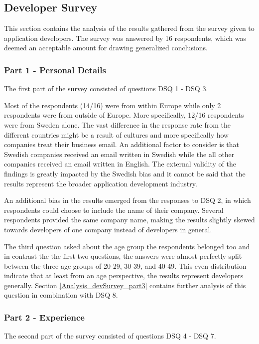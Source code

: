 \documentclass[a4paper,12pt]{article}
\begin{document}
\subsection{Developer Survey}
\label{Analysis_devSurvey}
This section contains the analysis of the results gathered from the survey given to application developers. The survey was answered by 16 respondents, which was deemed an acceptable amount for drawing generalized conclusions.

\subsubsection{Part 1 - Personal Details}
\label{Analysis_devSurvey_part1}
The first part of the survey consisted of questions DSQ 1 - DSQ 3. 

Most of the respondents (14/16) were from within Europe while only 2 respondents were from outside of Europe. More specifically, 12/16 respondents were from Sweden alone. The vast difference in the response rate from the different countries might be a result of cultures and more specifically how companies treat their business email. An additional factor to consider is that Swedish companies received an email written in Swedish while the all other companies received an email written in English. The external validity of the findings is greatly impacted by the Swedish bias and it cannot be said that the results represent the broader application development industry.

An additional bias in the results emerged from the responses to DSQ 2, in which respondents could choose to include the name of their company. Several respondents provided the same company name, making the results slightly skewed towards developers of one company instead of developers in general.

The third question asked about the age group the respondents belonged too and in contrast the the first two questions, the answers were almost perfectly split between the three age groups of 20-29, 30-39, and 40-49. This even distribution indicate that at least from an age perspective, the results represent developers generally. Section \ref{Analysis_devSurvey_part3} contains further analysis of this question in combination with DSQ 8.

\subsubsection{Part 2 - Experience}
\label{Analysis_devSurvey_part2}
The second part of the survey consisted of questions DSQ 4 - DSQ 7.
\end{document}
